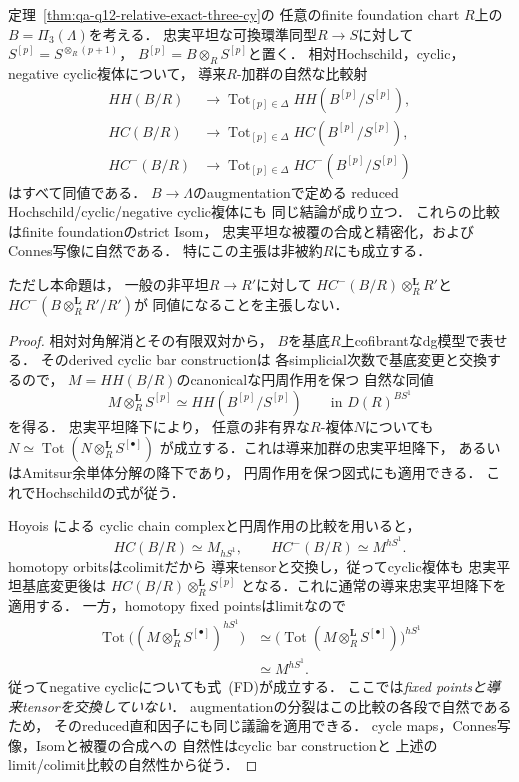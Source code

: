 \begin{proposition}
\label{prop:qa-q12-fppf-cyclic-complex-descent}
定理~\ref{thm:qa-q12-relative-exact-three-cy}の
任意のfinite foundation chart $R$上の
$B=\Pi_3(\Lambda)$を考える．
忠実平坦な可換環準同型$R\to S$に対して
$S^{[p]}=S^{\otimes_R(p+1)}$，
$B^{[p]}=B\otimes_R S^{[p]}$と置く．
相対Hochschild，cyclic，negative cyclic複体について，
導来$R$-加群の自然な比較射
\[
\begin{aligned}
 HH(B/R)&\longrightarrow
  \operatorname{Tot}_{[p]\in\Delta}
  HH(B^{[p]}/S^{[p]}),\\
 HC(B/R)&\longrightarrow
  \operatorname{Tot}_{[p]\in\Delta}
  HC(B^{[p]}/S^{[p]}),\\
 HC^-(B/R)&\longrightarrow
  \operatorname{Tot}_{[p]\in\Delta}
  HC^-(B^{[p]}/S^{[p]})
\end{aligned}
\tag{FD}\label{eq:qa-q12-cyclic-fppf-descent}
\]
はすべて同値である．
$B\to\Lambda$のaugmentationで定める
reduced Hochschild/cyclic/negative cyclic複体にも
同じ結論が成り立つ．
これらの比較はfinite foundationのstrict Isom，
忠実平坦な被覆の合成と精密化，および
Connes写像に自然である．
特にこの主張は非被約$R$にも成立する．

ただし本命題は，
一般の非平坦$R\to R'$に対して
$HC^-(B/R)\otimes_R^{\mathbf L}R'$と
$HC^-(B\otimes_R^{\mathbf L}R'/R')$が
同値になることを主張しない．
\end{proposition}
\begin{proof}
相対対角解消とその有限双対から，
$B$を基底$R$上cofibrantなdg模型で表せる．
そのderived cyclic bar constructionは
各simplicial次数で基底変更と交換するので，
$M=HH(B/R)$のcanonicalな円周作用を保つ
自然な同値
\[
 M\otimes_R^{\mathbf L}S^{[p]}
 \simeq HH(B^{[p]}/S^{[p]})
 \qquad\text{in }D(R)^{BS^1}
 \tag{FB}\label{eq:qa-q12-hh-circle-flat-basechange}
\]
を得る．
忠実平坦降下により，
任意の非有界な$R$-複体$N$についても
$N\simeq
\operatorname{Tot}(N\otimes_R^{\mathbf L}S^{[\bullet]})$
が成立する．これは導来加群の忠実平坦降下，
あるいはAmitsur余単体分解の降下であり，
円周作用を保つ図式にも適用できる．
これでHochschildの式が従う．

Hoyois \cite{HoyoisCircle2019}による
cyclic chain complexと円周作用の比較を用いると，
\[
 HC(B/R)\simeq M_{hS^1},
 \qquad HC^-(B/R)\simeq M^{hS^1}.
\]
homotopy orbitsはcolimitだから
導来tensorと交換し，従ってcyclic複体も
忠実平坦基底変更後は
$HC(B/R)\otimes_R^{\mathbf L}S^{[p]}$
となる．これに通常の導来忠実平坦降下を適用する．
一方，homotopy fixed pointsはlimitなので
\[
\begin{aligned}
 \operatorname{Tot}
   \bigl((M\otimes_R^{\mathbf L}S^{[\bullet]})^{hS^1}\bigr)
 &\simeq
 \bigl(\operatorname{Tot}
       (M\otimes_R^{\mathbf L}S^{[\bullet]})\bigr)^{hS^1}\\
 &\simeq M^{hS^1}.
\end{aligned}
\]
従ってnegative cyclicについても式~(FD)が成立する．
ここでは\emph{fixed pointsと導来tensorを交換していない}．
augmentationの分裂はこの比較の各段で自然であるため，
そのreduced直和因子にも同じ議論を適用できる．
cycle maps，Connes写像，Isomと被覆の合成への
自然性はcyclic bar constructionと
上述のlimit/colimit比較の自然性から従う．
\end{proof}

